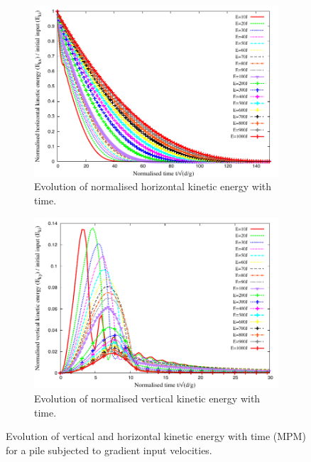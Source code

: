 \documentclass[3p,times,procedia,number]{elsarticle}
\begin{document}
\begin{figure}[tbhp]
  \centering
  \begin{subfigure}[b]{0.49\textwidth}
    \includegraphics[width=\textwidth]{figs/Normalised_KEx_Slope}
    \caption{Evolution of normalised horizontal kinetic energy with time.}
    \label{fig:Normalised_KEx_Slope}
  \end{subfigure}
  \begin{subfigure}[b]{0.49\textwidth}
    \centering
    \includegraphics[width=\textwidth]{figs/Normalised_KEy_Slope}
    \caption{Evolution of normalised vertical kinetic energy with time.}
    \label{fig:Normalised_KEy_Slope}
  \end{subfigure}
  \caption{Evolution of vertical and horizontal kinetic energy with time (MPM) 
  for a pile subjected to gradient input velocities.}
  \label{fig:Normalised_KEx_KEy_Slope}
\end{figure}
\end{document}
